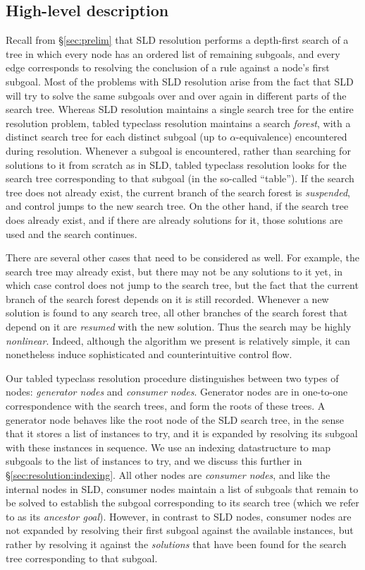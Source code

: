 \documentclass[runningheads]{llncs}
\begin{document}
\subsection{High-level description}
\label{sec:resolution:overview}
Recall from \S\ref{sec:prelim} that SLD resolution performs a depth-first search of a tree in which every node has an ordered list of remaining subgoals,
and every edge corresponds to resolving the conclusion of a rule against a node's first subgoal.
Most of the problems with SLD resolution arise from the fact that SLD will try to solve the same subgoals over and over again in different
parts of the search tree.
Whereas SLD resolution maintains a single search tree for the entire resolution problem,
tabled typeclass resolution maintains a search \emph{forest}, with a distinct search tree for each distinct subgoal
(up to $\alpha$-equivalence) encountered during resolution.
Whenever a subgoal is encountered,
rather than searching for solutions to it from scratch as in SLD,
tabled typeclass resolution looks for the search tree corresponding to that subgoal (in the so-called ``table'').
If the search tree does not already exist, the current branch of the search forest is \emph{suspended},
and control jumps to the new search tree.
On the other hand, if the search tree does already exist,
and if there are already solutions for it, those solutions are used and the search continues.

There are several other cases that need to be considered as well.
For example, the search tree may already exist, but there may not be any solutions to it yet,
in which case control does not jump to the search tree, but the fact that the current
branch of the search forest depends on it is still recorded.
Whenever a new solution is found to any search tree, all other branches of the search forest that depend on it
are \emph{resumed} with the new solution.
Thus the search may be highly \emph{nonlinear}. Indeed, although the algorithm we present is relatively simple,
it can nonetheless induce sophisticated and counterintuitive control flow.

Our tabled typeclass resolution procedure distinguishes between two types of nodes: \emph{generator nodes} and \emph{consumer nodes}.
Generator nodes are in one-to-one correspondence with the search trees, and form the roots of these trees.
A generator node behaves like the root node of the SLD search tree, in the sense that it stores a list of instances to try,
and it is expanded by resolving its subgoal with these instances in sequence.
We use an indexing datastructure to map subgoals to the list of instances to try, and we discuss this further in \S\ref{sec:resolution:indexing}.
All other nodes are \emph{consumer nodes}, and like
the internal nodes in SLD, consumer nodes maintain a list of subgoals that remain to be solved to establish the
subgoal corresponding to its search tree (which we refer to as its \emph{ancestor goal}). However, in contrast to SLD nodes, consumer nodes
are not expanded by resolving their first subgoal against the available instances,
but rather by resolving it against the \emph{solutions} that have been found for the search tree corresponding
to that subgoal.
\end{document}
